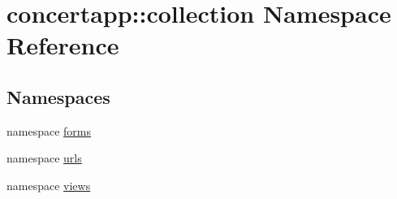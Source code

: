 \hypertarget{namespaceconcertapp_1_1collection}{
\section{concertapp::collection Namespace Reference}
\label{namespaceconcertapp_1_1collection}
}
\subsection*{Namespaces}
\begin{DoxyCompactItemize}
\item 
namespace \hyperlink{namespaceconcertapp_1_1collection_1_1forms}{forms}
\item 
namespace \hyperlink{namespaceconcertapp_1_1collection_1_1urls}{urls}
\item 
namespace \hyperlink{namespaceconcertapp_1_1collection_1_1views}{views}
\end{DoxyCompactItemize}
